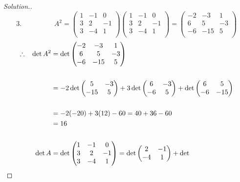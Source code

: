 \documentclass[11pt,a4paper]{article}
\theoremstyle{definition}
\newenvironment{solution}
  {\renewcommand{\qedsymbol}{}\begin{proof}[\textit{Solution}.]}
  {\end{proof}}
\begin{document}
\begin{solution}
$$3.\hspace{2cm} A^2=
\begin{pmatrix}
1&-1&0\\3&2&-1\\3&-4&1\\
\end{pmatrix}
\begin{pmatrix}
1&-1&0\\3&2&-1\\3&-4&1\\
\end{pmatrix}
=
\begin{pmatrix}
-2&-3&1\\6&5&-3\\-6&-15&5\\
\end{pmatrix}
$$
\begin{align*}
\therefore\hspace{0.3cm} \det A^2 &=\det
\begin{pmatrix}
-2&-3&1\\6&5&-3\\-6&-15&5\\
\end{pmatrix}\\\\
&=-2\det
\begin{pmatrix}
5&-3\\-15&5\\
\end{pmatrix}
+3\det
\begin{pmatrix}
6&-3\\-6&5\\
\end{pmatrix}
+\det
\begin{pmatrix}
6&5\\-6&-15\\
\end{pmatrix}\\\\
&=-2(-20)+3(12)-60=40+36-60\\
&=16\\\\
\det A&=\det
\begin{pmatrix}
1&-1&0\\3&2&-1\\3&-4&1
\end{pmatrix}=\det
\begin{pmatrix}
2&-1\\-4&1\\
\end{pmatrix}+\det

\end{align*}
\end{solution}
\end{document}
